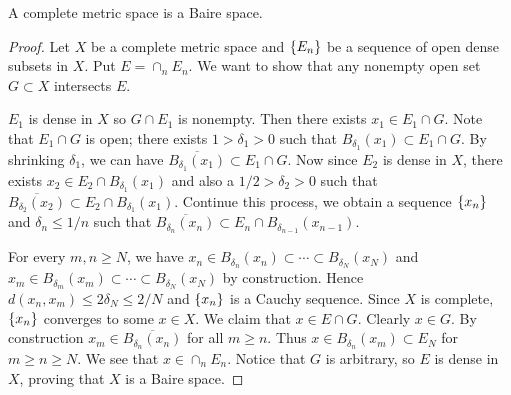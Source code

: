 \begin{theorem}
    A complete metric space is a Baire space.
\end{theorem}
\begin{proof}
    Let $X$ be a complete metric space and $\left\{ {E_n} \right\}$ be a 
    sequence of open dense subsets in $X$. Put $E = \cap_n E_n$. 
    We want to show that any nonempty open set $G\subset X$ 
    intersects $E$. 

    $E_1$ is dense in $X$ so $G\cap E_1$ is nonempty. Then 
    there exists $x_1\in E_1\cap G$. Note that $E_1\cap G$ 
    is open; there exists $1>\delta_1>0$ such that 
    $B_{\delta_1}(x_1)\subset E_1\cap G$. By shrinking $\delta_1$, 
    we can have $\overline{B_{\delta_1}(x_1)}\subset E_1\cap G$. 
    Now since $E_2$ is dense in $X$, there exists $x_2\in E_2\cap 
    B_{\delta_1}(x_1)$ and also a $1/2>\delta_2>0$ such that 
    $\overline{B_{\delta_2}(x_2)}\subset E_2\cap B_{\delta_1}(x_1)$. 
    Continue this process, we obtain a sequence $\left\{ {x_n} \right\}$ and 
    $\delta_n\leq 1/n$ such that $\overline{B_{\delta_n}(x_n)}\subset 
    E_n\cap B_{\delta_{n-1}}(x_{n-1})$.

    For every $m,n\geq N$, we have $x_n\in B_{\delta_n}(x_n)\subset 
    \cdots\subset B_{\delta_N}(x_N)$ and $x_m\in B_{\delta_m}(x_m) 
    \subset \cdots\subset B_{\delta_N}(x_N)$ by construction. Hence 
    $d(x_n,x_m)\leq 2\delta_N\leq 2/N$ and $\left\{ {x_n} \right\}$ is a Cauchy 
    sequence. Since $X$ is complete, $\left\{ {x_n} \right\}$ converges to some 
    $x\in X$. We claim that $x\in E\cap G$. Clearly $x\in G$. By 
    construction $x_m\in \overline{B_{\delta_n}(x_n)}$ for all 
    $m\geq n$. Thus $x\in B_{\delta_n}(x_m)\subset E_N$ for $m\geq 
    n\geq N$. We see that $x\in\cap_n E_n$. Notice that $G$ is 
    arbitrary, so $E$ is dense in $X$, proving that $X$ is a Baire 
    space.
\end{proof}

